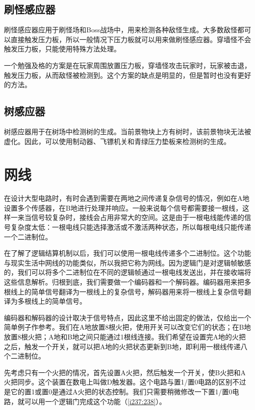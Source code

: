 \subsection{刷怪感应器}
刷怪感应器应用于刷怪场和Boss战场中，用来检测各种敌怪生成。大多数敌怪都可以直接触发压力板，所以一般情况下压力板就可以用来做刷怪感应器。穿墙怪不会触发压力板，只能使用特殊方法处理。

一个勉强及格的方案是在玩家周围放置压力板，穿墙怪攻击玩家时，玩家被击退，触发压力板，从而敌怪被检测到。这个方案的缺点是明显的，但是暂时也没有更好的方法。

\subsection{树感应器}
树感应器用于在树场中检测树的生成。当前景物块上方有树时，该前景物块无法被虚化。因此，可以使用制动器、飞镖机关和青绿压力垫板来检测树的生成。

\section{网线}

在设计大型电路时，有时会遇到需要在两地之间传递复杂信号的情况，例如在A地设置多个传感器，在B地进行处理并响应。一般来说每个信号都需要接一根线，这样一来当信号较复杂时，接线会占用非常大的空间。这是由于一根电线能传递的信号复杂度太低：一根电线只能选择激活或不激活两种状态，所以每根电线只能传递一个二进制位。

在了解了逻辑结算机制以后，我们可以使用一根电线传递多个二进制位。这个功能与现实生活中网线的功能类似，所以我把它称为网线。因为逻辑门是对逻辑帧敏感的，我们可以将多个二进制位在不同的逻辑帧通过一根电线发送出，并在接收端将这些信息解析。归根到底，我们需要做一个编码器和一个解码器。编码器用来把多根线上的简单信号翻译为一根线上的复杂信号，解码器用来将一根线上复杂信号翻译为多根线上的简单信号。

编码器和解码器的设计取决于信号特点，因此这里不给出固定的做法，仅给出一个简单例子作参考。我们在A地放置8根火把，使用开关可以改变它们的状态；在B地放置8根火把；A地和B地之间只能通过1根线连接。我们希望在设置完A地的火把之后，触发一个开关，就可以把A地的火把状态更新到B地，即利用一根线传递八个二进制位。

先考虑只有一个火把的情况，首先设置A火把，然后触发一个开关，使B火把和A火把同步。这个装置在数电上叫做D触发器。这个电路与置1/置0电路的区别不过是它的置1或置0是通过A火把的状态控制。我们只需要稍微修改一下置1/置0电路，就可以用一个逻辑门完成这个功能（\autoref{i237:238}）。

